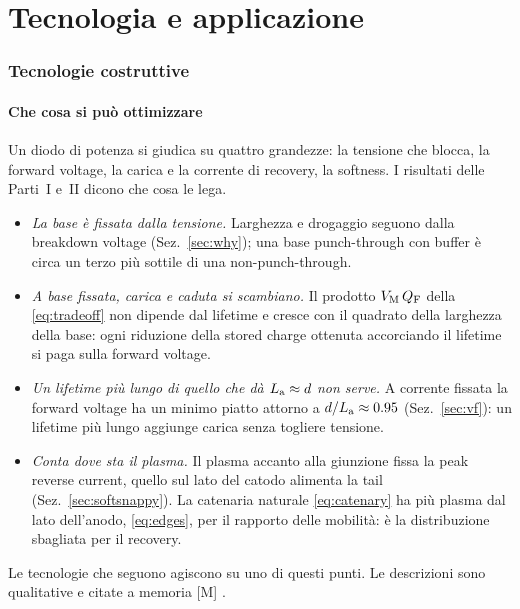 \documentclass[10pt,a4paper]{scrartcl}
\let\newcommand\pdvaluedefine
\newcommand{\La}{L_\mathrm{a}}
\newcommand{\VM}{V_\mathrm{M}}
\newcommand{\QF}{Q_\mathrm{F}}
\newcommand{\Pp}{p\textsuperscript{+}}
\newcommand{\Nm}{n\textsuperscript{--}}
\begin{document}
\part{Tecnologia e applicazione}

\section{Tecnologie costruttive}
\label{sec:technology}
\subsection{Che cosa si può ottimizzare}
Un diodo di potenza si giudica su quattro grandezze: la tensione che blocca, la forward voltage, la carica e la corrente di recovery, la softness. I risultati delle Parti~I e~II dicono che cosa le lega.
\begin{itemize}
\item \emph{La base è fissata dalla tensione.} Larghezza e drogaggio seguono dalla breakdown voltage (Sez.~\ref{sec:why}); una base punch-through con buffer è circa un terzo più sottile di una non-punch-through.
\item \emph{A base fissata, carica e caduta si scambiano.} Il prodotto $\VM\,\QF$ della \eqref{eq:tradeoff} non dipende dal lifetime e cresce con il quadrato della larghezza della base: ogni riduzione della stored charge ottenuta accorciando il lifetime si paga sulla forward voltage.
\item \emph{Un lifetime più lungo di quello che dà $\La \approx d$ non serve.} A corrente fissata la forward voltage ha un minimo piatto attorno a $d/\La \approx \num{\pdVfMinBeta}$ (Sez.~\ref{sec:vf}): un lifetime più lungo aggiunge carica senza togliere tensione.
\item \emph{Conta dove sta il plasma.} Il plasma accanto alla giunzione \Pp\Nm{} fissa la peak reverse current, quello sul lato del catodo alimenta la tail (Sez.~\ref{sec:softsnappy}). La catenaria naturale \eqref{eq:catenary} ha più plasma dal lato dell'anodo, \eqref{eq:edges}, per il rapporto delle mobilità: è la distribuzione sbagliata per il recovery.
\end{itemize}
Le tecnologie che seguono agiscono su uno di questi punti. Le descrizioni sono qualitative e citate a memoria [M] \cite{lutz,baliga}.
\end{document}
